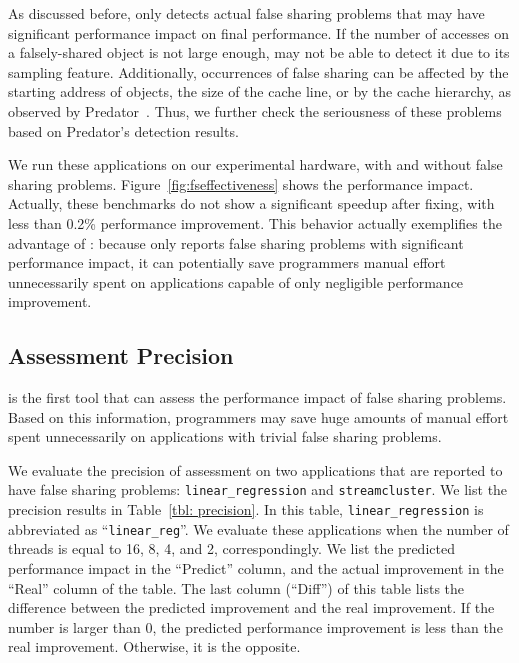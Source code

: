 As discussed before, \cheetah{} only detects actual false sharing problems that may have significant performance impact on final performance. If the number of accesses on a falsely-shared object is not large enough, \cheetah{} may not be able to detect it due to its sampling feature.  Additionally, occurrences of false sharing can be affected by the starting address of objects, the size of the cache line, or by the cache hierarchy, as observed by Predator~\cite{Predator}. Thus, we further check the seriousness of these problems based on Predator's detection results. 

We run these applications on our experimental hardware, with and without false sharing problems. Figure~\ref{fig:fseffectiveness} shows the performance impact. Actually, these benchmarks do not show a significant speedup after fixing, with less than 0.2\% performance improvement. This behavior actually exemplifies the advantage of \Cheetah{}: because \cheetah{} only reports false sharing problems with significant performance impact, it can potentially save programmers manual effort unnecessarily spent on applications capable of only negligible performance improvement. 

\subsection{Assessment Precision}
\label{sec:precision}

\cheetah{} is the first tool that can assess the performance impact of false sharing problems. Based on this information, programmers may save huge amounts of manual effort spent unnecessarily on applications with trivial false sharing problems. 

We evaluate the precision of assessment on two applications that are reported to have false sharing problems: \texttt{linear\_regression} and \texttt{streamcluster}. We list the precision results in Table~\ref{tbl: precision}. In this table, \texttt{linear\_regression} is abbreviated as ``\texttt{linear\_reg}''.  We evaluate these applications when the number of threads is equal to 16, 8, 4, and 2, correspondingly. We list the predicted performance impact in the ``Predict'' column, and the actual improvement in the ``Real'' column of the table. The last column (``Diff'') of this table lists the difference between the predicted improvement and the real improvement. If the number is larger than 0, the predicted performance improvement is less than the real improvement. Otherwise, it is the opposite. 


